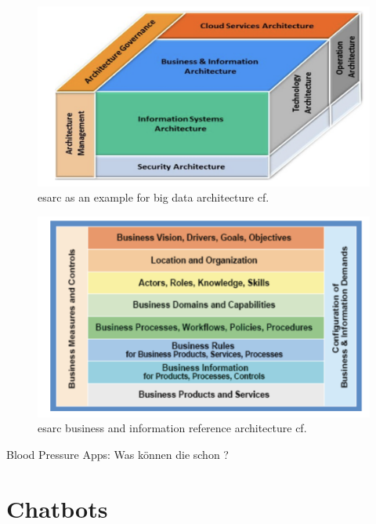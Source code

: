 \begin{figure}[htbp]
	\centering
	\includegraphics[width=1\textwidth]{images/esarc_cube.png}
	\caption{\ac{esarc} as an example for big data architecture cf.\autocite{zimmermann}}
	\label{vp_architecture}
\end{figure}

\begin{figure}[htbp]
	\centering
	\includegraphics[width=1\textwidth]{images/esarc_business.png}
	\caption{\ac{esarc} business and information reference architecture cf.\autocite{zimmermann}}
	\label{vp_architecture}
\end{figure}

Blood Pressure Apps:
Was können die schon ? 
\section{Chatbots} 




